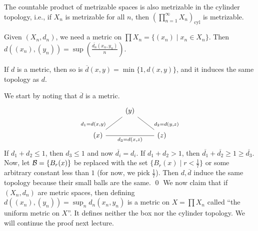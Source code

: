 \begin{simplethm}
    The countable product of metrizable spaces is also metrizable in the cylinder topology, i.e., if $X_n$ is metrizable for all $n$, then $\left(\prod_{n=1}^\infty X_n\right)_\mathrm{cyl}$ is metrizable.
\end{simplethm}
\noindent Given $(X_n, d_n)$, we need a metric on $\prod X_n = \{(x_n) \mid x_n \in X_n\}$. Then $d\left((x_n), (y_n)\right) = \sup\left( \frac{\overline{d_n}(x_n, y_n)}{n} \right)$.
\begin{simplelemma}
    If $d$ is a metric, then so is $\overline{d}(x, y) = \min\{1, d(x, y)\}$, and it induces the same topology as $d$.
\end{simplelemma}
\noindent We start by noting that $\overline{d}$ is a metric.
\[\begin{tikzcd}
	& {(y)} \\
	{(x)} && {(z)}
	\arrow["{d_1 = d(x,y)}"'{pos=0.9}, no head, from=1-2, to=2-1]
	\arrow["{d_2 = d(y,z)}"{pos=0.9}, no head, from=1-2, to=2-3]
	\arrow["{d_3 = d(x,z)}"', no head, from=2-1, to=2-3]
\end{tikzcd}\]
If $d_1 + d_2 \leq 1$, then $d_3 \leq 1$ and now $\overline{d_i} = d_i$. If $d_1 + d_2 > 1$, then $\overline{d_1} + \overline{d_2} \geq 1 \geq \overline{d_3}$. Now, let $\mathcal B = \{B_r(x)\}$ be replaced with the set $\{B_r(x) \mid r < \frac{1}{7}\}$ or some arbitrary constant less than $1$ (for now, we pick $\frac{1}{7}$). Then $d, \overline{d}$ induce the same topology because their small balls are the same. \qed
\medskip\newline
\noindent We now claim that if $(X_n, d_n)$ are metric spaces, then defining $d((x_n), (y_n)) = \sup_n d_n(x_n, y_n)$ is a metric on $X = \prod X_n$ called ``the uniform metric on $X$''. It defines neither the box nor the cylinder topology.
\medskip\newline
\noindent We will continue the proof next lecture.